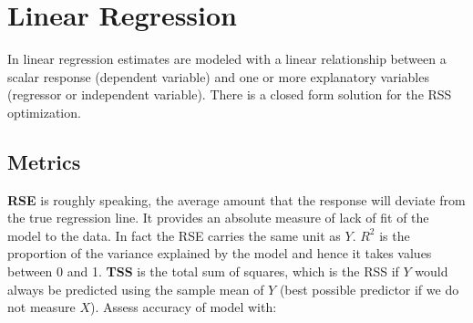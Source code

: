 \documentclass[../Main.tex]{subfiles}
\begin{document}
\newpage
\section{Linear Regression}
In linear regression estimates are modeled with a linear relationship between a scalar response (dependent variable) 
and one or more explanatory variables (regressor or independent variable). There is a closed form solution for the RSS optimization.


\subsection{Metrics}
\textbf{RSE} is roughly speaking, the average amount that the response will deviate from the true regression line. It provides an absolute measure of lack of fit of the model to the data. In fact the RSE carries the same unit as \(Y\).\textbf{ \(R^2\)} is the proportion of the variance explained by the model and hence it takes values between 0 and 1. \textbf{TSS} is the total sum of squares, which is the RSS if \(Y\) would always be predicted using the sample mean of \(Y\) (best possible predictor if we do not measure \(X\)). Assess accuracy of model with:
\end{document}
